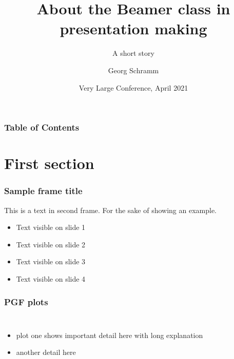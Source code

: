 \documentclass[8pt,aspectratio=169,xcolor=dvipsnames]{beamer} %
\title[About Beamer] %
{\textbf{About the Beamer class in presentation making}}
\subtitle{A short story}
\author[Schramm, Georg] %
{Georg Schramm\inst{1}}
\institute[KUL] %
{
  \inst{1}%
  Department of Imaging and Pathology\\
  KU Leuven
}
\date[VLC 2021] %
{Very Large Conference, April 2021}
\begin{document}
\frame{\titlepage}


\begin{frame}
\frametitle{Table of Contents}
\tableofcontents
\end{frame}


\section{First section}

\begin{frame}
\frametitle{Sample frame title}
This is a text in second frame. For the sake of showing an example.

\begin{itemize}
    \item<1-> Text visible on slide 1
    \item<2-> Text visible on slide 2
    \item<3>  Text visible on slide 3
    \item<4-> Text visible on slide 4
\end{itemize}
\end{frame}

\begin{frame}
\frametitle{PGF plots}

\begin{columns}
  \begin{itemize}
    \item plot one shows important detail here with long explanation
    \item another detail here
  \end{itemize}

  
  \begin{center}
  \end{center}
\end{columns}

\end{frame}
\end{document}
